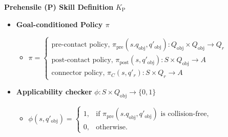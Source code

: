 \noindent\hrulefill

\noindent \textbf{Prehensile (P) Skill Definition} $K_{\text{P}}$

\begin{itemize}\label{Def:P}
    \item \textbf{Goal-conditioned Policy $\pi$}
    \begin{itemize}

        \item \(\pi = 
            \begin{cases} 
            \text{pre-contact policy, } \pi_\text{pre}(s.q_\text{obj}, q'_\text{obj}): Q_\text{obj} \times Q_\text{obj} \rightarrow Q_r\\
            \text{post-contact policy, } \pi_\text{post}(s, q'_\text{obj}): S \times Q_\text{obj} \rightarrow A \\
            \text{connector policy, } \pi_C(s, q'_r): S \times Q_r \rightarrow A

            \end{cases}\)
    \end{itemize}


    \item \textbf{Applicability checker} $\phi: S \times Q_\text{obj} \rightarrow \{0, 1\}$
    \begin{itemize}
        \item \(\phi(s, q'_\text{obj}) = 
        \begin{cases} 
        1, & \text{if } \pi_\text{pre}(s.q_\text{obj}, q'_\text{obj}) \text{ is collision-free}, \\ 
        0, & \text{otherwise.} 
        \end{cases}\)
    \end{itemize}

\end{itemize}
\noindent\hrulefill